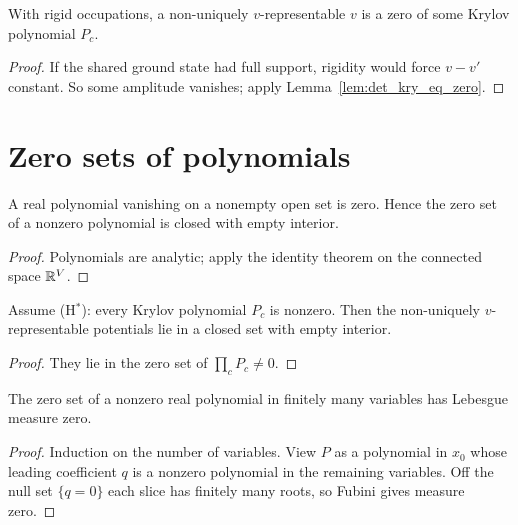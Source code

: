 \begin{theorem}
  \label{thm:nonUV_imp_krylov_zero}
  \leanok
  With rigid occupations, a non-uniquely $v$-representable $v$ is a zero of some Krylov polynomial $P_c$.
\end{theorem}
\begin{proof}
  \leanok
  If the shared ground state had full support, rigidity would force $v-v'$ constant. So some amplitude
  vanishes; apply Lemma~\ref{lem:det_kry_eq_zero}.
\end{proof}

\section{Zero sets of polynomials}

\begin{theorem}
  \label{thm:zeroSet_closed_nowhere}
  \leanok
  A real polynomial vanishing on a nonempty open set is zero. Hence the zero set of a nonzero polynomial is
  closed with empty interior.
\end{theorem}
\begin{proof}
  \leanok
  Polynomials are analytic; apply the identity theorem on the connected space $\mathbb{R}^V$.
\end{proof}

\begin{theorem}
  \label{thm:generic_hk}
  \leanok
  Assume (H$^*$): every Krylov polynomial $P_c$ is nonzero. Then the non-uniquely $v$-representable
  potentials lie in a closed set with empty interior.
\end{theorem}
\begin{proof}
  \leanok
  They lie in the zero set of $\prod_cP_c\neq0$.
\end{proof}

\begin{theorem}
  \label{thm:volume_zeroSet}
  \leanok
  The zero set of a nonzero real polynomial in finitely many variables has Lebesgue measure zero.
\end{theorem}
\begin{proof}
  \leanok
  Induction on the number of variables. View $P$ as a polynomial in $x_0$ whose leading coefficient $q$ is
  a nonzero polynomial in the remaining variables. Off the null set $\{q=0\}$ each slice has finitely many
  roots, so Fubini gives measure zero.
\end{proof}

